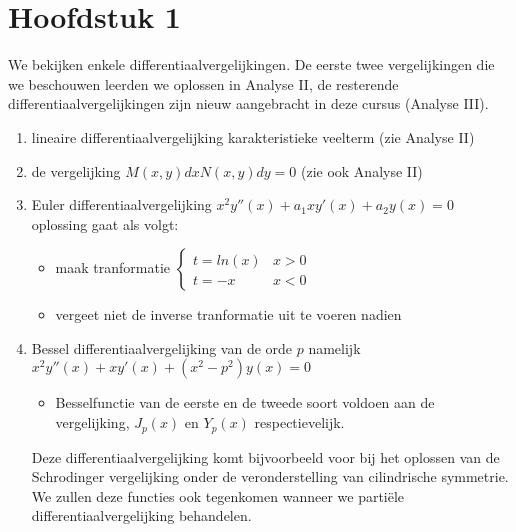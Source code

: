 \documentclass[../../master_thesis/4_written_text/main/main.tex]{subfiles}
\begin{document}
\section{Hoofdstuk 1}
We bekijken enkele differentiaalvergelijkingen. De eerste twee vergelijkingen die we beschouwen leerden we oplossen in Analyse II, de resterende differentiaalvergelijkingen zijn nieuw aangebracht in deze cursus (Analyse III).

\begin{enumerate}
\item lineaire differentiaalvergelijking \hfill karakteristieke veelterm (zie Analyse II)

\item de vergelijking $M(x,y)dx  N(x,y)dy = 0$ \hfill
(zie ook Analyse II)

\item Euler differentiaalvergelijking $x^2y''(x) + a_1xy'(x) + a_2y(x) = 0$ \hfill oplossing gaat als volgt:
\begin{itemize}
\item maak tranformatie $\begin{cases} t=ln(x) & x>0\\ t=-x  & x<0 \end{cases}$
\item vergeet niet de inverse tranformatie uit te voeren nadien
\end{itemize}

\item Bessel differentiaalvergelijking van de orde $p$ namelijk $x^2y''(x) + xy'(x) + (x^2-p^2)y(x) = 0$ 
\begin{itemize}
\item Besselfunctie van de eerste en de tweede soort voldoen aan de vergelijking, $J_p(x)$ en $Y_p(x)$ respectievelijk.
\end{itemize}
Deze differentiaalvergelijking komt bijvoorbeeld voor bij het oplossen van de Schrodinger vergelijking onder de veronderstelling van cilindrische symmetrie. We zullen deze functies ook tegenkomen wanneer we partiële differentiaalvergelijking behandelen.
\end{enumerate}
\end{document}
